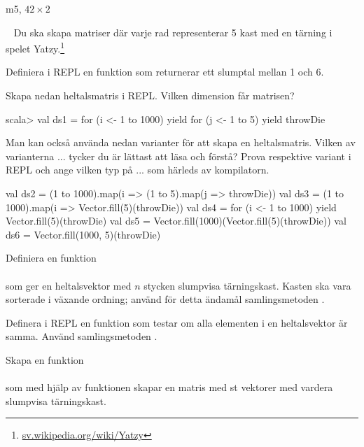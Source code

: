 \SubtaskSolved  m5, $42 \times 2$

\QUESTEND






\QUESTBEGIN

\Task  \label{matrices:task:yatzy} \what~  Du ska skapa matriser där varje rad representerar 5 kast med en tärning i spelet Yatzy.\footnote{\href{https://sv.wikipedia.org/wiki/Yatzy}{sv.wikipedia.org/wiki/Yatzy}}


\Subtask Definiera i REPL en funktion  som returnerar ett slumptal mellan 1 och 6.

\Subtask Skapa nedan heltalsmatris i REPL. Vilken dimension får matrisen?
\begin{REPL}
scala> val ds1 = for (i <- 1 to 1000) yield 
            for (j <- 1 to 5) yield throwDie
          
\end{REPL}

\Subtask Man kan också använda nedan varianter för att skapa en heltalsmatris. Vilken av varianterna  ...  tycker du är lättast att läsa och förstå? Prova respektive variant i REPL och ange vilken typ på  ...  som härleds av kompilatorn.
\begin{REPL}
val ds2 = (1 to 1000).map(i => (1 to 5).map(j => throwDie))
val ds3 = (1 to 1000).map(i => Vector.fill(5)(throwDie))
val ds4 = for (i <- 1 to 1000) yield Vector.fill(5)(throwDie)
val ds5 = Vector.fill(1000)(Vector.fill(5)(throwDie))
val ds6 = Vector.fill(1000, 5)(throwDie)
\end{REPL}


\Subtask Definiera en funktion \\ \\ som ger en heltalsvektor med $n$ stycken slumpvisa tärningskast. Kasten ska vara sorterade i växande ordning; använd för detta ändamål samlingsmetoden .


\Subtask \label{matrices:subtask:isyatzyforall} Definera i REPL en funktion  som testar om alla elementen i en heltalsvektor är samma. Använd samlingsmetoden .


\Subtask Skapa en funktion  \\  \\ som med hjälp av funktionen  skapar en matris med  st vektorer med vardera  slumpvisa tärningskast.


